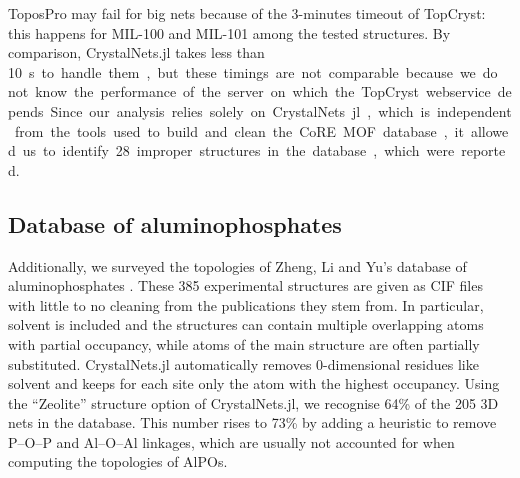 \documentclass[main.tex]{subfiles}
\begin{document}
ToposPro may fail for big nets because of the 3-minutes timeout of TopCryst: this happens for MIL-100 and MIL-101 among the tested structures. By comparison, CrystalNets.jl takes less than \SI{10}s to handle them, but these timings are not comparable because we do not know the performance of the server on which the TopCryst webservice depends.

Since our analysis relies solely on CrystalNets.jl, which is independent from the tools used to build and clean the CoRE MOF database, it allowed us to identify 28 improper structures in the database, which were reported.


\subsection{Database of aluminophosphates}

Additionally, we surveyed the topologies of Zheng, Li and Yu's database of aluminophosphates \autocite{ALPO}. These 385 experimental structures are given as CIF files with little to no cleaning from the publications they stem from. In particular, solvent is included and the structures can contain multiple overlapping atoms with partial occupancy, while atoms of the main structure are often partially substituted. CrystalNets.jl automatically removes 0-dimensional residues like solvent and keeps for each site only the atom with the highest occupancy. %
Using the ``Zeolite'' structure option of CrystalNets.jl, we recognise {64\%} of the 205 3D nets in the database. This number rises to {73\%} by adding a heuristic to remove P--O--P and Al--O--Al linkages, which are usually not accounted for when computing the topologies of AlPOs.
\end{document}
